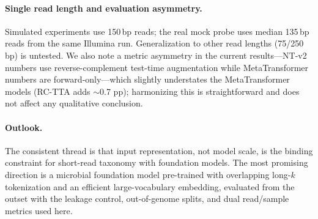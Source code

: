 \paragraph{Single read length and evaluation asymmetry.}
Simulated experiments use 150\,bp reads; the real mock probe uses median
135\,bp reads from the same Illumina run. Generalization to other read lengths
(75/250\,bp) is untested. We also note a metric asymmetry in the current
results---NT-v2 numbers use reverse-complement test-time augmentation while
MetaTransformer numbers are forward-only---which slightly understates the
MetaTransformer models (RC-TTA adds $\sim$0.7 pp); harmonizing this is
straightforward and does not affect any qualitative conclusion.

\paragraph{Outlook.}
The consistent thread is that input representation, not model scale, is the
binding constraint for short-read taxonomy with foundation models. The most
promising direction is a microbial foundation model pre-trained with
overlapping long-$k$ tokenization and an efficient large-vocabulary embedding,
evaluated from the outset with the leakage control, out-of-genome splits, and
dual read/sample metrics used here.
